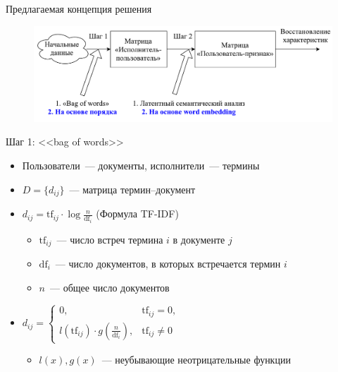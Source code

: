 \documentclass{beamer}
\begin{document}
\begin{frame}{Предлагаемая концепция решения}
    \begin{figure}
        \includegraphics[width=\textwidth]{figures/master-concept.pdf}
    \end{figure}
\end{frame}

\begin{frame}{Шаг 1: <<bag of words>>}
  \begin{itemize}
      \item {Пользователи~--- документы, исполнители~--- термины}
      \item {$D = \{d_{ij}\}$~--- матрица термин--документ}
      \item {$d_{ij} = \mathrm{tf}_{ij} \cdot \log{\frac{n}{\mathrm{df}_{i}}}$ (Формула TF-IDF)}
          \begin{itemize}
              \item $\mathrm{tf}_{ij}$~--- число встреч термина $i$ в документе $j$
              \item $\mathrm{df}_{i}$~--- число документов, в которых встречается термин $i$
              \item $n$~--- общее число документов
          \end{itemize}
      \item {$d_{ij} = \begin{cases}
          0,& \mathrm{tf}_{ij} = 0,\\
          l(\mathrm{tf}_{ij}) \cdot g(\frac{n}{\mathrm{df}_{i}}),& \mathrm{tf}_{ij} \ne 0
      \end{cases}$}
          \begin{itemize}
              \item {$l(x), g(x)$~--- неубывающие неотрицательные функции}
          \end{itemize}
  \end{itemize}
\end{frame}
\end{document}
